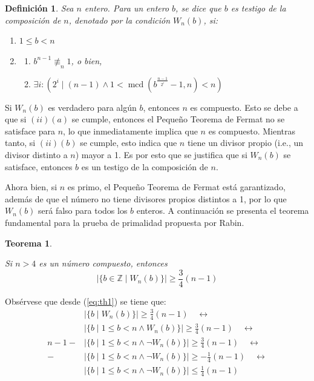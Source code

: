 \documentclass[hidelinks, 12pt]{article}
\newcommand{\Z}{\mathbb{Z}}
\DeclareMathOperator{\mcd}{mcd}
\newcommand{\llra}{\longleftrightarrow}
\newtheorem{theorem}{Teorema}
\newtheorem*{definition}{Definición}
\begin{document}
\begin{definition}
    Sea $n$ entero. Para un entero $b$, se dice que $b$ es testigo de la composición de $n$, denotado por la condición $W_n(b)$, si:
    \begin{enumerate}[label=\textup{(}\roman*\textup{)}]
        \item $1\leq b<n$
        \item \begin{enumerate}[label=\textup{(}\alph*\textup{)}] 
            \item $b^{n-1}\not\equiv_n 1$\textup{, o bien,}
            \item $\exists i:(2^i\mid(n-1)\wedge 1<\mcd(b^{\frac{n-1}{2^i}}-1,n)<n)$
        \end{enumerate}
    \end{enumerate}
\end{definition}

Si $W_n(b)$ es verdadero para algún $b$, entonces $n$ es compuesto. Esto se debe a que si $(ii)(a)$ se cumple, entonces el Pequeño Teorema de Fermat no se satisface para $n$, lo que inmediatamente implica que $n$ es compuesto. Mientras tanto, si $(ii)(b)$ se cumple, esto indica que $n$ tiene un divisor propio (i.e., un divisor distinto a $n$) mayor a 1. Es por esto que se justifica que si $W_n(b)$ se satisface, entonces $b$ es un testigo de la composición de $n$.

Ahora bien, si $n$ es primo, el Pequeño Teorema de Fermat está garantizado, además de que el número no tiene divisores propios distintos a 1, por lo que $W_n(b)$ será falso para todos los $b$ enteros. A continuación se presenta el teorema fundamental para la prueba de primalidad propuesta por Rabin.

\begin{theorem}
\label{th:1}
    Si $n>4$ es un número compuesto, entonces 
    \begin{equation}
        |\{b\in\Z\mid W_n(b)\}|\geq \frac{3}{4}(n-1)
        \label{eq:th1}
    \end{equation}
\end{theorem}

Obsérvese que desde (\ref{eq:th1}) se tiene que:
\begin{align*}
    &|\{b\mid W_n(b)\}|\geq\frac{3}{4}(n-1) \quad\llra\\
    &|\{b\mid 1\leq b<n\wedge W_n(b)\}|\geq \frac{3}{4}(n-1) \quad\llra\\
    n-1-&|\{b\mid 1\leq b<n\wedge\neg W_n(b)\}|\geq\frac{3}{4}(n-1) \quad\llra\\
    -&|\{b\mid 1\leq b<n\wedge\neg W_n(b)\}|\geq-\frac{1}{4}(n-1) \quad\llra\\
    &|\{b\mid 1\leq b<n\wedge\neg W_n(b)\}|\leq\frac{1}{4}(n-1) \\
\end{align*}
\end{document}
